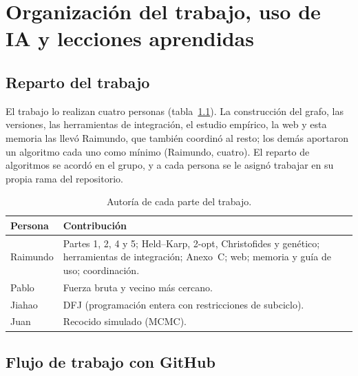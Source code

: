 \chapter{Organización del trabajo, uso de IA y lecciones aprendidas}\label{cap:organizacion}

\section{Reparto del trabajo}

El trabajo lo realizan cuatro personas (tabla~\ref{tab:equipo}). La construcción del grafo, las versiones, las herramientas de integración, el estudio empírico, la web y esta memoria las llevó Raimundo, que también coordinó al resto; los demás aportaron un algoritmo cada uno como mínimo
(Raimundo, cuatro). El reparto de algoritmos se acordó en el grupo, y a cada persona se le asignó trabajar en su propia rama del repositorio.

\begin{table}[htbp]
  \centering
  \caption{Autoría de cada parte del trabajo.}\label{tab:equipo}
  \small
  \begin{tabularx}{\linewidth}{@{}l X@{}}
    \toprule
    Persona & Contribución \\
    \midrule
    Raimundo & Partes 1, 2, 4 y 5; Held--Karp, 2-opt, Christofides y genético; herramientas de integración; Anexo~C; web; memoria y guía de uso; coordinación. \\
    Pablo & Fuerza bruta y vecino más cercano. \\
    Jiahao & DFJ (programación entera con restricciones de subciclo). \\
    Juan & Recocido simulado (MCMC). \\
    \bottomrule
  \end{tabularx}
\end{table}

\section{Flujo de trabajo con GitHub}

